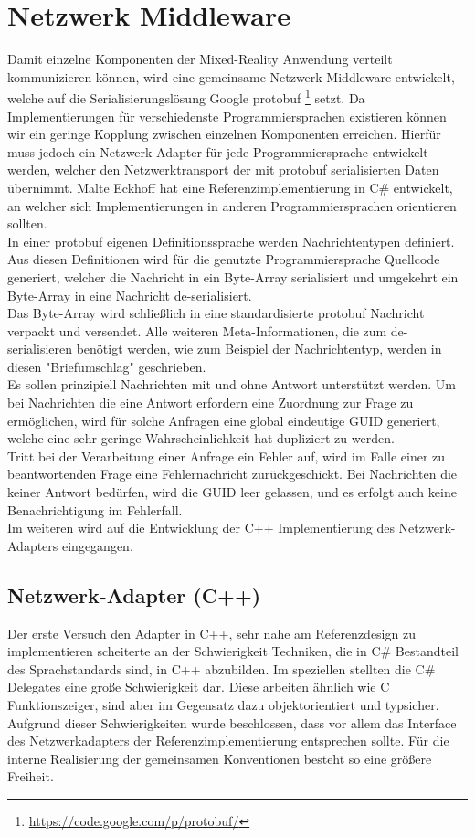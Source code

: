 \section{Netzwerk Middleware}
\label{sec:network}
Damit einzelne Komponenten der Mixed-Reality Anwendung verteilt kommunizieren können, wird eine gemeinsame Netzwerk-Middleware entwickelt, welche auf die Serialisierungslösung Google protobuf \footnote{\url{https://code.google.com/p/protobuf/}} setzt. Da Implementierungen für verschiedenste Programmiersprachen existieren können wir ein geringe Kopplung zwischen einzelnen Komponenten erreichen. Hierfür muss jedoch ein Netzwerk-Adapter für jede Programmiersprache entwickelt werden, welcher den Netzwerktransport der mit protobuf serialisierten Daten übernimmt. Malte Eckhoff hat eine Referenzimplementierung in C\# entwickelt, an welcher sich Implementierungen in anderen Programmiersprachen orientieren sollten.\\

In einer protobuf eigenen Definitionssprache werden Nachrichtentypen definiert. Aus diesen Definitionen wird für die genutzte Programmiersprache Quellcode generiert, welcher die Nachricht in ein Byte-Array serialisiert und umgekehrt ein Byte-Array in eine Nachricht de-serialisiert. \\
Das Byte-Array wird schließlich in eine standardisierte protobuf Nachricht verpackt und versendet. Alle weiteren Meta-Informationen, die zum de-serialisieren benötigt werden, wie zum Beispiel der Nachrichtentyp, werden in diesen "Briefumschlag" geschrieben. \\
Es sollen prinzipiell Nachrichten mit und ohne Antwort unterstützt werden. Um bei Nachrichten die eine Antwort erfordern eine Zuordnung zur Frage zu ermöglichen, wird für solche Anfragen eine global eindeutige GUID generiert, welche eine sehr geringe Wahrscheinlichkeit hat dupliziert zu werden. \\
Tritt bei der Verarbeitung einer Anfrage ein Fehler auf, wird im Falle einer zu beantwortenden Frage eine Fehlernachricht zurückgeschickt. Bei Nachrichten die keiner Antwort bedürfen, wird die GUID leer gelassen, und es erfolgt auch keine Benachrichtigung im Fehlerfall.\\
Im weiteren wird auf die Entwicklung der C++ Implementierung des Netzwerk-Adapters eingegangen.\\

\subsection{Netzwerk-Adapter (C++)}
Der erste Versuch den Adapter in C++, sehr nahe am Referenzdesign zu implementieren scheiterte an der Schwierigkeit Techniken, die in C\# Bestandteil des Sprachstandards sind, in C++ abzubilden. Im speziellen stellten die C\# Delegates eine große Schwierigkeit dar. Diese arbeiten ähnlich wie C Funktionszeiger, sind aber im Gegensatz dazu objektorientiert und typsicher. Aufgrund dieser Schwierigkeiten wurde beschlossen, dass vor allem das Interface des Netzwerkadapters der Referenzimplementierung entsprechen sollte. Für die interne Realisierung der gemeinsamen Konventionen besteht so eine größere Freiheit.\\

